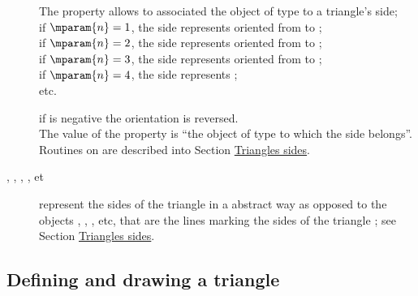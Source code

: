 \documentclass[pdftex]{article}
\begin{document}
\begin{description}
  The property  allows to associated the object of type
   to a triangle's side;\\
  if $\mparam{n}=1$, the side represents  oriented
  from  to ;\\
  if $\mparam{n}=2$, the side represents  oriented
  from  to ;\\
  if $\mparam{n}=3$, the side represents  oriented
  from  to ;\\
  if $\mparam{n}=4$, the side represents ;\\
  etc.

  if  is negative the orientation is reversed.\\
  The value of the property  is ``the object of type
   to which the side belongs''.\\
  Routines on  are described into Section
  \href{#subsection.vertex}{Triangles sides}.
\item[\param{AB}, \param{BC}, \param{CA}, \param{BA}, \param{AC} et \param{CB}]
  represent the sides of the triangle in a abstract way as opposed to
  the objects  , , ,
  etc, that are the lines marking the sides of the
  triangle ; see Section
  \href{#subsection.vertex}{Triangles sides}.
\end{description}

\subsection{Defining and drawing a triangle}
\end{document}
